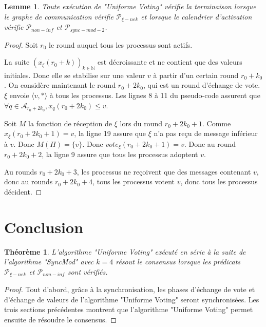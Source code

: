 \documentclass{article}
\newtheorem{lemma}{Lemme}
\newtheorem{theorem}{Théorème}
\begin{document}
	\begin{lemma}
		Toute exécution de "Uniforme Voting" vérifie la terminaison lorsque le graphe de communication vérifie $\mathcal{P}_{\xi-nek}$
		et lorsque le calendrier d'activation vérifie $\mathcal{P}_{non-inf}$ et $\mathcal{P}_{sync-mod-2}$.
	\end{lemma}
	\begin{proof}
		Soit $r_0$ le round auquel tous les processus sont actifs.

		La suite $(x_\xi(r_0+k))_{k \in \mathds{N}}$ est décroissante et ne contient que des valeurs initiales. Donc elle se stabilise sur une valeur $v$ à partir d'un certain round $r_0+k_0$.
		On considère maintenant le round $r_0+2k_0$, qui est un round d'échange de vote.
		$\xi$ envoie $\langle v, * \rangle$ à tous les processus. Les lignes 8 à 11 du pseudo-code assurent que $\forall q \in \mathcal{A}_{r_0+2k_0}, x_q(r_0+2k_0) \leq v$.

		Soit $M$ la fonction de réception de $\xi$ lors du round $r_0+2k_0+1$.
		Comme $x_\xi(r_0+2k_0+1) = v$, la ligne 19 assure que $\xi$ n'a pas reçu de message inférieur à $v$.
		Donc $M(\Pi) = \{v\}$. Donc $vote_\xi(r_0+2k_0+1) = v$. Donc au round $r_0+2k_0+2$, la ligne 9 assure que tous les processus adoptent $v$.

		Au rounds $r_0+2k_0+3$, les processus ne reçoivent que des messages contenant $v$, donc au rounds $r_0+2k_0+4$, tous les processus votent $v$, donc tous les processus décident.
	\end{proof}
\section{Conclusion}

\begin{theorem}
	L'algorithme "Uniforme Voting" exécuté en série à la suite de l'algorithme "SyncMod" avec $k = 4$
	résout le consensus lorsque les prédicats $\mathcal{P}_{\xi-nek}$ et $\mathcal{P}_{non-inf}$ sont vérifiés.
\end{theorem}
\begin{proof}
	Tout d'abord, grâce à la synchronisation, les phases d'échange de vote et d'échange de valeurs de l'algorithme "Uniforme Voting" seront synchronisées.
	Les trois sections précédentes montrent que l'algorithme "Uniforme Voting" permet ensuite de résoudre le consensus.

\end{proof}
\end{document}
